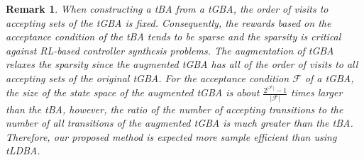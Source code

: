 \documentclass[letterpaper, 10 pt, conference]{ieeeconf}  %
\newtheorem{remark}{Remark}
\begin{document}
\begin{remark}

  When constructing a tBA from a tGBA, the order of visits to accepting sets of the tGBA is fixed. Consequently, the rewards based on the acceptance condition of the tBA tends to be sparse and the sparsity is critical against RL-based controller synthesis problems. The augmentation of tGBA relaxes the sparsity since the augmented tGBA has all of the order of visits to all accepting sets of the original tGBA. For the acceptance condition $\mathcal{F}$ of a tGBA, the size of the state space of the augmented tGBA is about $\frac{2^{|\mathcal{F}|}-1}{|\mathcal{F}|}$ times larger than the tBA, however, the ratio of the number of accepting transitions to the number of all transitions of the augmented tGBA is much greater than the tBA. Therefore, our proposed method is expected more sample efficient than using tLDBA.
\end{remark}

\end{document}
